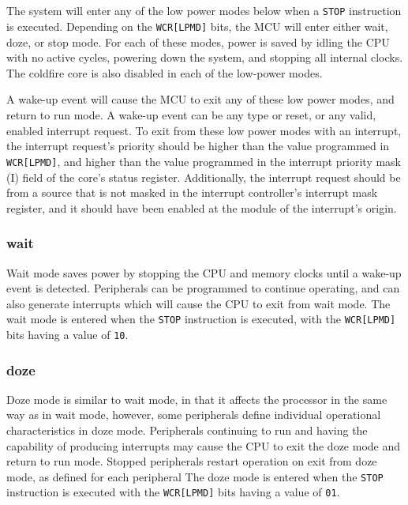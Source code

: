 \subsection*{}
The system will enter any of the low power modes below when a \texttt{STOP}
instruction is executed. Depending on the \texttt{WCR[LPMD]} bits, the MCU will
enter either wait, doze, or stop mode.
For each of these modes, power is saved by idling the CPU with no active
cycles, powering down the system, and stopping all internal clocks. The coldfire
core is also disabled in each of the low-power modes. 

A wake-up event will cause the MCU to exit any of these low power modes, and
return to run mode. A wake-up event can be any type or reset, or any valid,
enabled interrupt request. To exit from these low power modes with an interrupt,
the interrupt request's priority should be higher than the value programmed in
\texttt{WCR[LPMD]}, and higher than the value programmed in the interrupt
priority mask (I) field of the core’s status register. Additionally, the
interrupt request should be from a source that is not masked in the interrupt
controller’s interrupt mask register, and it should have been enabled at the
module of the interrupt’s origin.

\subsubsection{wait} 
Wait mode saves power by stopping the CPU and memory clocks until a wake-up
event is detected. Peripherals can be programmed to continue operating, and can
also generate interrupts which will cause the CPU to exit from wait mode. The
wait mode is entered when the \texttt{STOP} instruction is executed, with the
\texttt{WCR[LPMD]} bits having a value of \texttt{10}.

\subsubsection{doze} 
Doze mode is similar to wait mode, in that it affects the
processor in the same way as in wait mode, however, some peripherals define
individual operational characteristics in doze mode. Peripherals continuing to
run and having the capability of producing interrupts may cause the CPU to exit
the doze mode and return to run mode. Stopped peripherals restart operation on
exit from doze mode, as defined for each peripheral
The doze mode is entered when the \texttt{STOP} instruction is executed with the
\texttt{WCR[LPMD]} bits having a value of \texttt{01}.

